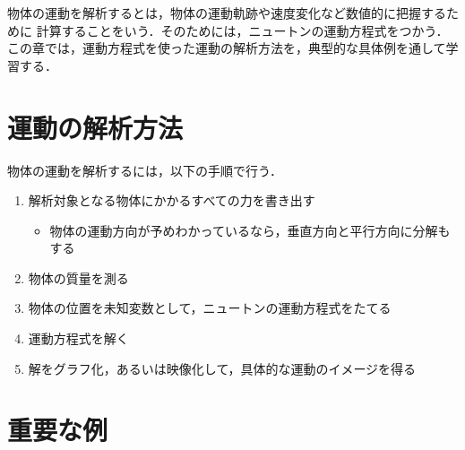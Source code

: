     \begin{mycomment}
        物体の運動を解析するとは，物体の運動軌跡や速度変化など数値的に把握するために
        計算することをいう．そのためには，ニュートンの運動方程式をつかう．
        この章では，運動方程式を使った運動の解析方法を，典型的な具体例を通して学習する．
    \end{mycomment}

    \section{運動の解析方法}
        物体の運動を解析するには，以下の手順で行う．
        \begin{enumerate}
            \item 解析対象となる物体にかかるすべての力を書き出す
            \begin{itemize}
                \item 物体の運動方向が予めわかっているなら，垂直方向と平行方向に分解もする
            \end{itemize}
            \item 物体の質量を測る
            \item 物体の位置を未知変数として，ニュートンの運動方程式をたてる
            \item 運動方程式を解く
            \item 解をグラフ化，あるいは映像化して，具体的な運動のイメージを得る
        \end{enumerate}

    \section{重要な例}
